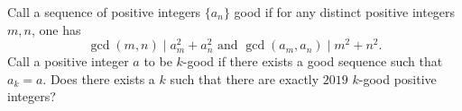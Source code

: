 Call a sequence of positive integers $\{a_n\}$ good if for any distinct positive integers $m,n$, one has
$$\gcd(m,n) \mid a_m^2 + a_n^2 \text{ and } \gcd(a_m,a_n) \mid m^2 + n^2.$$Call a positive integer $a$ to be $k$-good if there exists a good sequence such that $a_k = a$. Does there exists a $k$ such that there are exactly $2019$ $k$-good positive integers?